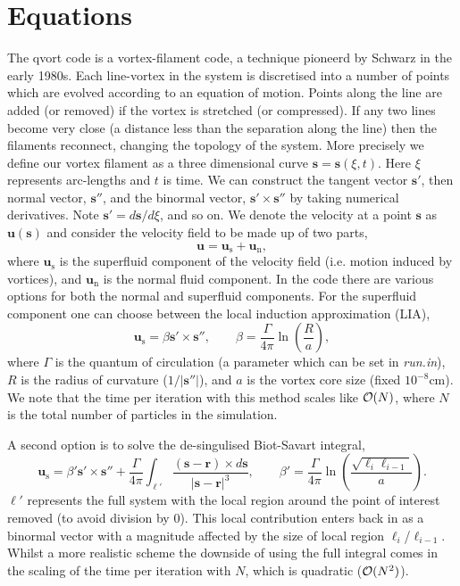 \documentclass[12pt]{article}
\newcommand{\bs}{\mathbf{s}}
\newcommand{\br}{\mathbf{r}}
\newcommand{\bu}{\mathbf{u}}
\begin{document}
\section{Equations}\label{Sec:eqn}
  The {\sc qvort} code is a vortex-filament code, a technique pioneerd by Schwarz in the early 1980s. 
  Each line-vortex in the system is discretised into a number of points which are evolved according to an equation of motion.
  Points along the line are added (or removed) if the vortex is stretched (or compressed).
  If any two lines become very close (a distance less than the separation along the line) then the filaments reconnect, changing the topology of the system.  
  More precisely we define our vortex filament as a three dimensional curve $\bs=\bs(\xi,t)$.
  Here $\xi$ represents arc-lengths and $t$ is time.
  We can construct the tangent vector $\bs'$, then normal vector, $\bs''$,
  and the binormal vector, $\bs' \times \bs''$ by taking numerical derivatives.
  Note $\bs'=d \bs/d\xi$, and so on.
  We denote the velocity at a point $\bs$ as $\bu(\bs)$ and consider the velocity field to be made up of two parts,
  \begin{equation} 
     \bu=\bu_\mathrm{s}+\bu_\mathrm{n},
  \end{equation} 
  where $\bu_\mathrm{s}$ is the superfluid component of the velocity field (i.e. motion induced by vortices),
  and $\bu_\mathrm{n}$ is the normal fluid component.
  In the code there are various options for both the normal and superfluid components.
  For the superfluid component one can choose between the local induction approximation (LIA),
  \begin{equation}\label{Eq:LIA}
    \bu_\mathrm{s}=\beta \bs' \times \bs'', \qquad \beta=\frac{\Gamma}{4\pi} \ln \left( \frac{R}{a} \right),
  \end{equation} 
  where $\Gamma$ is the quantum of circulation (a parameter which can be set in {\it run.in}), 
  $R$ is the radius of curvature ($1/|\bs''|$), and $a$ is the vortex core size (fixed $10^{-8}$cm).
  We note that the time per iteration with this method scales like ${\cal O}(N)$, where $N$ is the total
  number of particles in the simulation.

  A second option is to solve the de-singulised Biot-Savart integral,
  \begin{equation}\label{Eq:BS}
    \bu_\mathrm{s}=\beta' \bs' \times \bs''+ \frac{\Gamma}{4\pi} \int_{\ell'} \frac{(\bs-\br)\times d\bs}{|\bs-\br|^3},
    \qquad \beta'=\frac{\Gamma}{4\pi} \ln \left( \frac{\sqrt{\ell_{i}\ell_{i-1}}}{a}\right).
  \end{equation}
  $\ell'$ represents the full system with the local region around the point of interest removed (to avoid division by 0).
  This local contribution enters back in as a binormal vector with a magnitude affected by the size of local region $\ell_i$/$\ell_{i-1}$.
  Whilst a more realistic scheme the downside of using the full integral comes in the scaling of the time per iteration with $N$, which is quadratic (${\cal O}(N^2)$).
      
\end{document}
